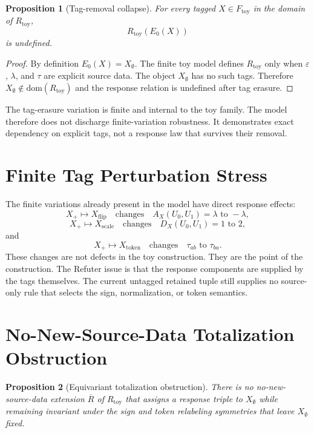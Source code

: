 \documentclass[11pt]{article}
\newtheorem{proposition}{Proposition}
\begin{document}
\begin{proposition}[Tag-removal collapse]
For every tagged \(X\in F_{\mathrm{toy}}\) in the domain of
\(R_{\mathrm{toy}}\),
\[
  R_{\mathrm{toy}}(E_0(X))
\]
is undefined.
\end{proposition}

\begin{proof}
By definition \(E_0(X)=X_{\emptyset}\). The finite toy model defines
\(R_{\mathrm{toy}}\) only when \(\varepsilon\), \(\lambda\), and
\(\tau\) are explicit source data. The object \(X_{\emptyset}\) has no
such tags. Therefore \(X_{\emptyset}\notin\mathrm{dom}(R_{\mathrm{toy}})\)
and the response relation is undefined after tag erasure.
\end{proof}

The tag-erasure variation is finite and internal to the toy family. The
model therefore does not discharge finite-variation robustness. It
demonstrates exact dependency on explicit tags, not a response law that
survives their removal.

\section{Finite Tag Perturbation Stress}

The finite variations already present in the model have direct response
effects:
\[
X_+\mapsto X_{\mathrm{flip}}
\quad\text{changes}\quad
A_X(U_0,U_1)=\lambda
\text{ to }
-\lambda,
\]
\[
X_+\mapsto X_{\mathrm{scale}}
\quad\text{changes}\quad
D_X(U_0,U_1)=1
\text{ to }
2,
\]
and
\[
X_+\mapsto X_{\mathrm{token}}
\quad\text{changes}\quad
\tau_{ab}
\text{ to }
\tau_{ba}.
\]
These changes are not defects in the toy construction. They are the
point of the construction. The Refuter issue is that the response
components are supplied by the tags themselves. The current untagged
retained tuple still supplies no source-only rule that selects the sign,
normalization, or token semantics.

\section{No-New-Source-Data Totalization Obstruction}

\begin{proposition}[Equivariant totalization obstruction]
There is no no-new-source-data extension \(\overline{R}\) of
\(R_{\mathrm{toy}}\) that assigns a response triple to \(X_{\emptyset}\)
while remaining invariant under the sign and token relabeling
symmetries that leave \(X_{\emptyset}\) fixed.
\end{proposition}
\end{document}
